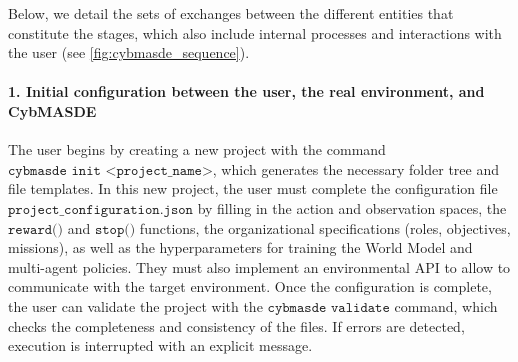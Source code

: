 Below, we detail the sets of exchanges between the different entities that constitute the stages, which also include internal processes and interactions with the user (see \autoref{fig:cybmasde_sequence}).

\paragraph{1. Initial configuration between the user, the real environment, and CybMASDE}

The user begins by creating a new project with the command $\texttt{cybmasde init <project\_name>}$, which generates the necessary folder tree and file templates. In this new project, the user must complete the configuration file $\texttt{project\_configuration.json}$ by filling in the action and observation spaces, the $\texttt{reward()}$ and $\texttt{stop()}$ functions, the organizational specifications (roles, objectives, missions), as well as the hyperparameters for training the World Model and multi-agent policies. They must also implement an environmental API to allow  to communicate with the target environment. Once the configuration is complete, the user can validate the project with the $\texttt{cybmasde validate}$ command, which checks the completeness and consistency of the files. If errors are detected, execution is interrupted with an explicit message.

